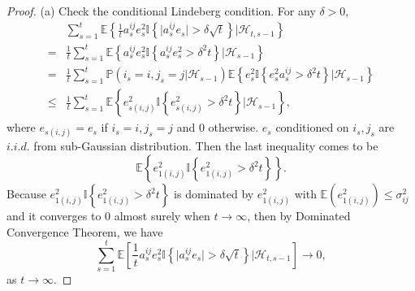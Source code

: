 \documentclass[12pt]{article}
\begin{document}
\begin{proof}
(a) Check the conditional Lindeberg condition. For any $\delta>0$,
\begin{align*}
    & \sum_{s=1}^t \mathbb{E} \left\{\frac{1}{t} a_s^{ij} e_s^2 \mathbb{I}\left\{\vert a_s^{ij} e_s \vert > \delta \sqrt{t} \right\} \Big \vert \mathcal{H}_{t,s-1}\right\} \\
    = & \frac{1}{t} \sum_{s=1}^t \mathbb{E} \left\{a_s^{ij} e_s^2\mathbb{I}\left\{ a_s^{ij} e_s^2 > \delta^2 t \right\} \Big \vert \mathcal{H}_{s-1}\right\} \\
    = & \frac{1}{t} \sum_{s=1}^t \mathbb{P}(i_s=i,j_s=j\vert \mathcal{H}_{s-1}) \mathbb{E} \left\{e_s^2\mathbb{I}\left\{e_s^2 a_s^{ij} > \delta^2 t \right\} \Big \vert \mathcal{H}_{s-1}\right\} \\
    \le & \frac{1}{t} \sum_{s=1}^t \mathbb{E} \left\{e_{s(i,j)}^2 \mathbb{I}\left\{e_{s(i,j)}^2 > \delta^2 t \right\} \Big \vert \mathcal{H}_{s-1}\right\},
\end{align*}
where $e_{s(i,j)}=e_s$ if $i_s=i,j_s=j$ and 0 otherwise. $e_s$ conditioned on $i_s,j_s$ are $i.i.d.$ from sub-Gaussian distribution. Then the last inequality comes to be 
\begin{equation*}
    \mathbb{E} \left\{e_{1(i,j)}^2 \mathbb{I}\left\{e_{1(i,j)}^2 > \delta^2 t \right\}\right\}.
\end{equation*}
Because $e_{1(i,j)}^2 \mathbb{I}\left\{e_{1(i,j)}^2 > \delta^2 t \right\}$ is dominated by $e_{1(i,j)}^2$ with $\mathbb{E}(e_{1(i,j)}^2)\le\sigma_{ij}^2$ and it converges to 0 almost surely when $t\to \infty$, then by Dominated Convergence Theorem, we have
\begin{equation*}
    \sum_{s=1}^t \mathbb{E} \left[\frac{1}{t} a_s^{ij} e_s^2 \mathbb{I}\left\{\vert  a_s^{ij} e_s \vert > \delta \sqrt{t} \right\} \Big \vert \mathcal{H}_{t,s-1}\right] \to 0,
\end{equation*}
as $t \to \infty$.


\end{proof}
\end{document}
